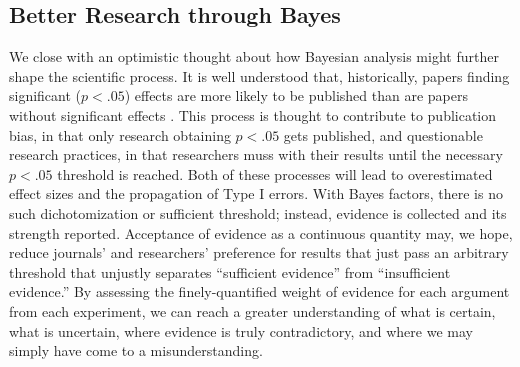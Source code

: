 \documentclass[man]{apa6}
\begin{document}
\subsection{Better Research through Bayes}
We close with an optimistic thought about how Bayesian analysis might further shape the scientific process. It is well understood that, historically, papers finding significant ($p < .05$) effects are more likely to be published than are papers without significant effects \citep{Cooper:etal:1997,Atkinson:etal:1982}. This process is thought to contribute to publication bias, in that only research obtaining $p<.05$ gets published, and questionable research practices, in that researchers muss with their results until the necessary $p < .05$ threshold is reached. Both of these processes will lead to overestimated effect sizes and the propagation of Type I errors. 
With Bayes factors, there is no such dichotomization or sufficient threshold; instead, evidence is collected and its strength reported. Acceptance of evidence as a continuous quantity may, we hope, reduce journals' and researchers' preference for results that just pass an arbitrary threshold that unjustly separates ``sufficient evidence'' from ``insufficient evidence.'' By assessing the finely-quantified weight of evidence for each argument from each experiment, we can reach a greater understanding of what is certain, what is uncertain, where evidence is truly contradictory, and where we may simply have come to a misunderstanding.

\end{document}
